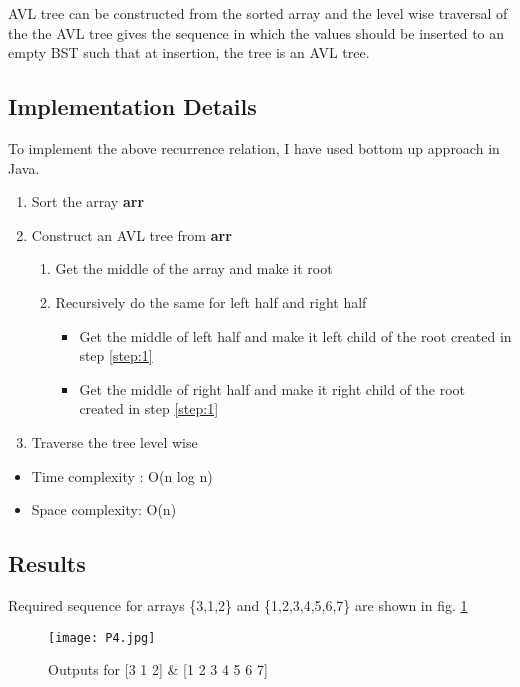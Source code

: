 \documentclass[11pt,a4paper]{article}
\begin{document}
AVL tree can be constructed from the sorted array and the level wise traversal of the the AVL tree gives the sequence in which the values should be inserted to an empty BST such that at insertion, the tree is an AVL tree.

\subsection{Implementation Details}\label{sec:details4}
To implement the above recurrence relation, I have used bottom up approach in Java.
\begin{enumerate}
  \item Sort the array \textbf{arr}
  \item Construct an AVL tree from \textbf{arr}
  \begin{enumerate}
      \item Get the middle of the array and make it root \label{step:1}
      \item Recursively do the same for left half and right half
      \begin{itemize}
          \item Get the middle of left half and make it left child of the root created in step \ref{step:1}
          \item Get the middle of right half and make it right child of the root created in step \ref{step:1}
      \end{itemize}
  \end{enumerate}
  \item Traverse the tree level wise
  
\end{enumerate}
\begin{itemize}
    \item Time complexity : O(n log n)
     \item Space complexity: O(n)
\end{itemize}

\subsection{Results}\label{sec:results4}
Required sequence for arrays \{3,1,2\} and \{1,2,3,4,5,6,7\} are shown in fig. \ref{fig:output_4}
\begin{figure}[ht]
\texttt{[image: P4.jpg]}
\centering
\caption{Outputs for [3 1 2] \& [1 2 3 4 5 6 7]}
\label{fig:output_4}
\end{figure}
\end{document}
